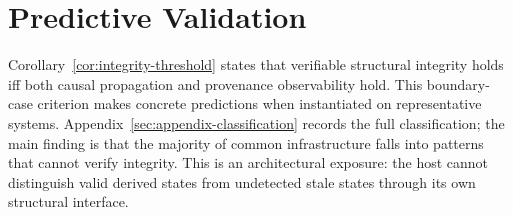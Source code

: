\section{Predictive Validation}\label{sec:evaluation}

Corollary~\ref{cor:integrity-threshold} states that verifiable structural integrity holds iff both causal propagation and provenance observability hold. This boundary-case criterion makes concrete predictions when instantiated on representative systems. Appendix~\ref{sec:appendix-classification} records the full classification; the main finding is that the majority of common infrastructure falls into patterns that cannot verify integrity. This is an architectural exposure: the host cannot distinguish valid derived states from undetected stale states through its own structural interface.
